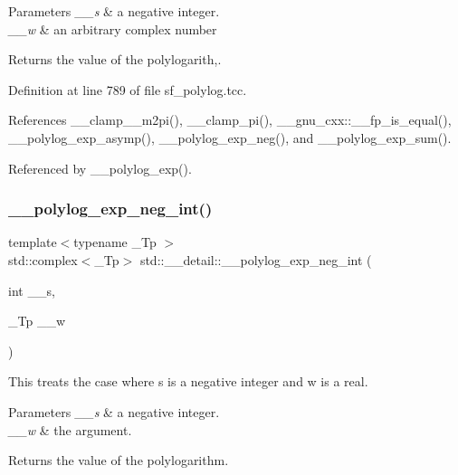 \begin{DoxyParams}{Parameters}
{\em \+\_\+\+\_\+s} & a negative integer. \\
\hline
{\em \+\_\+\+\_\+w} & an arbitrary complex number \\
\hline
\end{DoxyParams}
\begin{DoxyReturn}{Returns}
the value of the polylogarith,. 
\end{DoxyReturn}


Definition at line 789 of file sf\+\_\+polylog.\+tcc.



References \+\_\+\+\_\+clamp\+\_\+\_\+m2pi(), \+\_\+\+\_\+clamp\+\_\+pi(), \+\_\+\+\_\+gnu\+\_\+cxx\+::\+\_\+\+\_\+fp\+\_\+is\+\_\+equal(), \+\_\+\+\_\+polylog\+\_\+exp\+\_\+asymp(), \+\_\+\+\_\+polylog\+\_\+exp\+\_\+neg(), and \+\_\+\+\_\+polylog\+\_\+exp\+\_\+sum().



Referenced by \+\_\+\+\_\+polylog\+\_\+exp().

\mbox{\label{namespacestd_1_1____detail_a7a186c84c1673a2beabba25c91119c66}} 
\subsubsection{\texorpdfstring{\+\_\+\+\_\+polylog\+\_\+exp\+\_\+neg\+\_\+int()}{\_\_polylog\_exp\_neg\_int()}\hspace{0.1cm}{\footnotesize\ttfamily [2/2]}}
{\footnotesize\ttfamily template$<$typename \+\_\+\+Tp $>$ \\
std\+::complex$<$\+\_\+\+Tp$>$ std\+::\+\_\+\+\_\+detail\+::\+\_\+\+\_\+polylog\+\_\+exp\+\_\+neg\+\_\+int (\begin{DoxyParamCaption}\item[{int}]{\+\_\+\+\_\+s,  }\item[{\+\_\+\+Tp}]{\+\_\+\+\_\+w }\end{DoxyParamCaption})}

This treats the case where s is a negative integer and w is a real.


\begin{DoxyParams}{Parameters}
{\em \+\_\+\+\_\+s} & a negative integer. \\
\hline
{\em \+\_\+\+\_\+w} & the argument. \\
\hline
\end{DoxyParams}
\begin{DoxyReturn}{Returns}
the value of the polylogarithm. 
\end{DoxyReturn}


